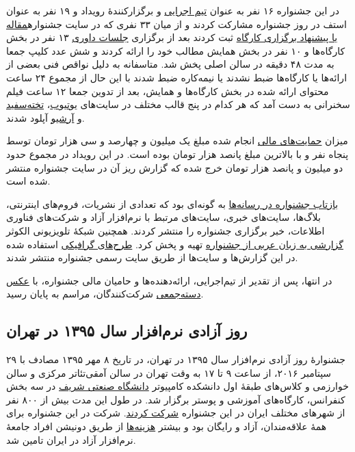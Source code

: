 \documentclass{article}
\begin{document}
{در این جشنواره ۱۶ نفر به عنوان \href{http://sfd.fsug.ir/1394/patronage/staff}{تیم اجرایی} و برگزارکنندهٔ رویداد و ۱۹ نفر به عنوان\hspace{100pt} استف در روز جشنواره مشارکت کردند و از میان ۳۳ نفری که در سایت جشنواره\newline \href{http://sfd.fsug.ir/1394/plan/articles}{مقاله یا پیشنهاد برگزاری کارگاه} ثبت کردند بعد از برگزاری \href{http://sfd.fsug.ir/1394/referee}{جلسات داوری} ۱۳ نفر در بخش کارگاه‌ها و ۱۰ نفر در بخش همایش مطالب خود را ارائه کردند و شش عدد کلیپ جمعا به مدت ۴۸ دقیقه در سالن اصلی پخش شد. متاسفانه به دلیل نواقص فنی بعضی از ارائه‌ها یا کارگاه‌ها ضبط نشدند یا نیمه‌کاره ضبط شدند با این حال از مجموع ۲۴ ساعت محتوای ارائه شده در بخش کارگاه‌ها و همایش، بعد از تدوین جمعا ۱۲ ساعت فیلم سخنرانی به دست آمد که هر کدام در پنج قالب مختلف در سایت‌های \href{https://www.youtube.com/channel/UCbhw92WI8GJZDdBMXn4ONXA?sub_confirmation=1}{یوتیوب}، \href{http://takhtesefid.org/user/freeknowledgefoundation}{تخته‌سفید} و \href{https://archive.org/search.php?query=subject%3A%22Free+Knowledge+Foundation%22}{آرشیو} آپلود شدند.

میزان \href{http://sfd.fsug.ir/1394/patronage/donation}{حمایت‌های مالی} انجام شده مبلغ یک میلیون و چهارصد و سی هزار تومان توسط پنجاه نفر و با بالاترین مبلغ پانصد هزار تومان بوده است. در این رویداد در مجموع حدود دو میلیون و پانصد هزار تومان خرج شده که گزارش ریز آن در سایت جشنواره منتشر شده است.


\href{http://sfd.fsug.ir/1394/in-media}{بازتاب جشنواره در رسانه‌ها} به گونه‌ای بود که تعدادی از نشریات، فروم‌های اینترنتی، بلاگ‌ها، سایت‌های خبری، سایت‌های مرتبط با نرم‌افزار آزاد و شرکت‌های فناوری اطلاعات، خبر برگزاری جشنواره را منتشر کردند. همچنین شبکهٔ تلویزیونی الکوثر \href{https://www.youtube.com/watch?v=pT-4Gc1Z4LQ}{گزارشی به زبان عربی از جشنواره} تهیه و پخش کرد. \href{http://sfd.fsug.ir/1394/artworks}{طرح‌های گرافیکی} استفاده شده در این گزارش‌ها و سایت‌ها از طریق سایت رسمی جشنواره منتشر شدند.

در انتها، پس از تقدیر از تیم‌اجرایی، ارائه‌دهنده‌ها و حامیان مالی جشنواره، با \href{http://sfd.fsug.ir/1394/photos}{عکس دسته‌جمعی} شرکت‌کنندگان، مراسم به پایان رسید.

\subsection{روز آزادی نرم‌افزار سال ۱۳۹۵ در تهران}
جشنوارهٔ روز آزادی نرم‌افزار سال ۱۳۹۵ در تهران، در تاریخ ۸ مهر ۱۳۹۵ مصادف با ۲۹ سپتامبر ۲۰۱۶، از ساعت ۹ تا ۱۷ به وقت تهران در سالن آمقی‌تئاتر مرکزی و سالن خوارزمی و کلاس‌های طبقهٔ اول دانشکده کامپیوتر \hspace{25pt} \href{http://sfd.fsug.ir/1395/directions}{دانشگاه صنعتی شریف} در سه بخش کنفرانس، کارگاه‌های آموزشی و پوستر برگزار شد.  در طول این مدت بیش از ۸۰۰ نفر از شهرهای مختلف ایران در این جشنواره \href{http://sfd.fsug.ir/1395/about-us/participation}{شرکت کردند}. شرکت در این جشنواره برای همهٔ علاقه‌مندان، آزاد و رایگان بود و بیشتر \href{http://sfd.fsug.ir/1395/patronage/donation}{هزینه‌ها} از طریق دونیشن افراد جامعهٔ نرم‌افزار آزاد در ایران تامین شد.

}
\end{document}
